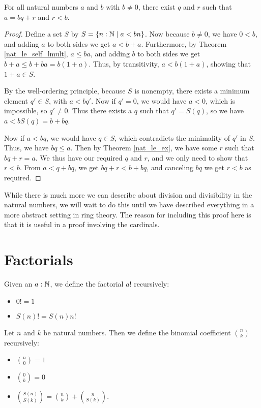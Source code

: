 \documentclass[../math.tex]{subfiles}
\begin{document}
\begin{theorem}
    For all natural numbers $a$ and $b$ with $b \neq 0$, there exist $q$ and $r$
    such that $a = bq + r$ and $r < b$.
\end{theorem}
\begin{proof}
    Define a set $S$ by $S = \{n : \mathbb{N} \mid a < bn\}$.  Now because $b \neq 0$,
    we have $0 < b$, and adding $a$ to both sides we get $a < b + a$.
    Furthermore, by Theorem \ref{nat_le_self_lmult}, $a \leq ba$, and adding $b$
    to both sides we get $b + a \leq b + ba = b(1 + a)$.  Thus, by transitivity,
    $a < b(1 + a)$, showing that $1 + a \in S$.

    By the well-ordering principle, because $S$ is nonempty, there exists a
    minimum element $q' \in S$, with $a < bq'$.  Now if $q' = 0$, we would have
    $a < 0$, which is impossible, so $q' \neq 0$.  Thus there exists a $q$ such
    that $q' = S(q)$, so we have $a < bS(q) = b + bq$.

    Now if $a < bq$, we would have $q \in S$, which contradicts the minimality
    of $q'$ in $S$.  Thus, we have $bq \leq a$.  Then by Theorem
    \ref{nat_le_ex}, we have some $r$ such that $bq + r = a$.  We thus have our
    required $q$ and $r$, and we only need to show that $r < b$.  From $a < q +
    bq$, we get $bq + r < b + bq$, and canceling $bq$ we get $r < b$ as
    required.
\end{proof}

While there is much more we can describe about division and divisibility in the
natural numbers, we will wait to do this until we have described everything in a
more abstract setting in ring theory.  The reason for including this proof here
is that it is useful in a proof involving the cardinals.

\section{Factorials}

\begin{definition}
    Given an $a : \mathbb{N}$, we define the factorial $a!$ recursively:
    \begin{itemize}
        \item $0! = 1$
        \item $S(n)! = S(n) n!$
    \end{itemize}
\end{definition}

\begin{definition}
    Let $n$ and $k$ be natural numbers.  Then we define the binomial coefficient
    $\binom{n}{k}$ recursively:
    \begin{itemize}
        \item $\displaystyle \binom{n}{0} = 1$
        \item $\displaystyle \binom{0}{k} = 0$
        \item $\displaystyle \binom{S(n)}{S(k)} = \binom{n}{k} +
            \binom{n}{S(k)}$.
    \end{itemize}
\end{definition}
\end{document}
